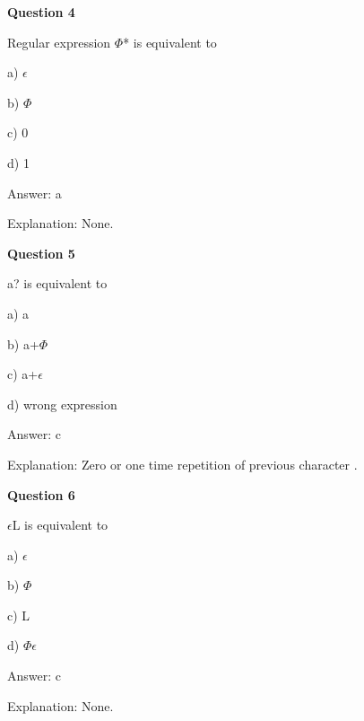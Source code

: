 \documentclass{article}
\begin{document}
\begin{mdframed}[linewidth=1pt, roundcorner=5pt, linecolor=gray!30, backgroundcolor=gray!5]
\textbf{Question 4} 

Regular expression $\Phi$* is equivalent to

a) $\epsilon$

b) $\Phi$

c) 0

d) 1
\vspace{5pt} \par
\begin{tcolorbox}[colback=green!5, colframe=green!40!black, title=Solution]
Answer: a

Explanation: None.
\end{tcolorbox}
\end{mdframed}

\begin{mdframed}[linewidth=1pt, roundcorner=5pt, linecolor=gray!30, backgroundcolor=gray!5]
\textbf{Question 5} 

a? is equivalent to

a) a

b) a+$\Phi$

c) a+$\epsilon$

d) wrong expression
\vspace{5pt} \par
\begin{tcolorbox}[colback=green!5, colframe=green!40!black, title=Solution]
Answer: c

Explanation: Zero or one time repetition of previous character .
\end{tcolorbox}
\end{mdframed}

\begin{mdframed}[linewidth=1pt, roundcorner=5pt, linecolor=gray!30, backgroundcolor=gray!5]
\textbf{Question 6} 

$\epsilon$L is equivalent to

a) $\epsilon$

b) $\Phi$

c) L

d) $\Phi$$\epsilon$
\vspace{5pt} \par
\begin{tcolorbox}[colback=green!5, colframe=green!40!black, title=Solution]
Answer: c

Explanation: None.
\end{tcolorbox}
\end{mdframed}
\newpage
\end{document}
